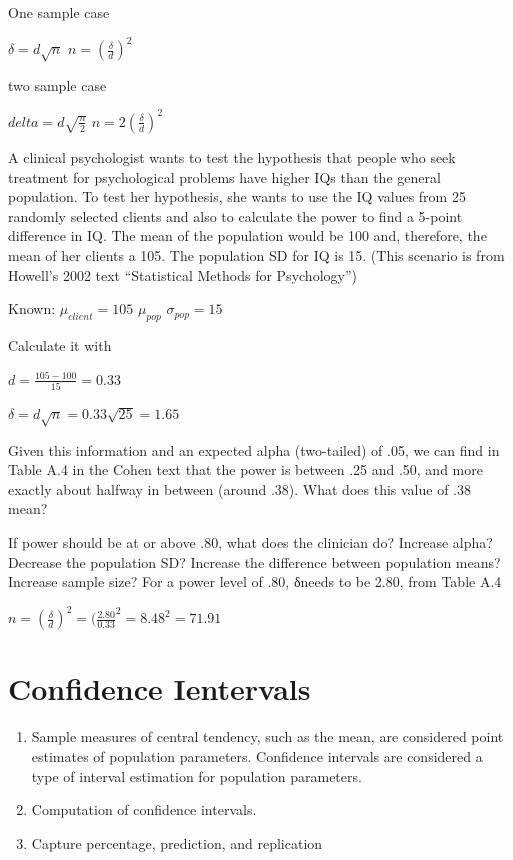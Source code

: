 \documentclass[]{book}
\theoremstyle{definition}
\theoremstyle{definition}
\theoremstyle{definition}
\theoremstyle{remark}
\begin{document}
One sample case

\(\delta = d\sqrt{n}\) \(n = (\frac{\delta}{d})^2\)

two sample case

\(delta = d\sqrt{\frac{n}{2}}\) \(n = 2(\frac{\delta}{d})^2\)

A clinical psychologist wants to test the hypothesis that people who
seek treatment for psychological problems have higher IQs than the
general population. To test her hypothesis, she wants to use the IQ
values from 25 randomly selected clients and also to calculate the power
to find a 5-point difference in IQ. The mean of the population would be
100 and, therefore, the mean of her clients a 105. The population SD for
IQ is 15. (This scenario is from Howell's 2002 text ``Statistical
Methods for Psychology'')

Known: \(\mu_{client}=105\) \(\mu_{pop}\) \(\sigma_{pop} = 15\)

Calculate it with

\(d = \frac{105-100}{15} = 0.33\)

\(\delta = d\sqrt{n} = 0.33\sqrt{25}=1.65\)

Given this information and an expected alpha (two-tailed) of .05, we can
find in Table A.4 in the Cohen text that the power is between .25 and
.50, and more exactly about halfway in between (around .38). What does
this value of .38 mean?

If power should be at or above .80, what does the clinician do? Increase
alpha? Decrease the population SD? Increase the difference between
population means? Increase sample size? For a power level of .80, δneeds
to be 2.80, from Table A.4

\(n = (\frac{\delta}{d})^2=(\frac{2.80}{0.33}^2 = 8.48^2 = 71.91\)

\section{Confidence Ientervals}\label{confidence-ientervals}

\begin{enumerate}
\def\labelenumi{\arabic{enumi}.}
\item
  Sample measures of central tendency, such as the mean, are considered
  point estimates of population parameters. Confidence intervals are
  considered a type of interval estimation for population parameters.
\item
  Computation of confidence intervals.
\item
  Capture percentage, prediction, and replication
\end{enumerate}
\end{document}
